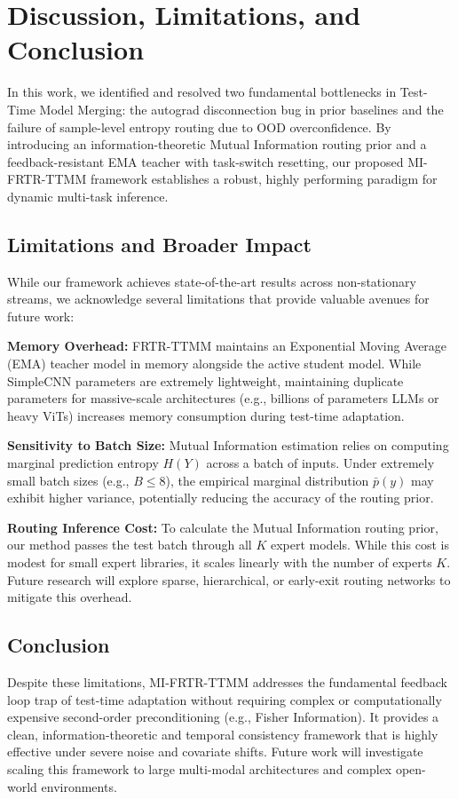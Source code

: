 \documentclass{article}
\theoremstyle{plain}
\theoremstyle{definition}
\theoremstyle{remark}
\begin{document}
\section{Discussion, Limitations, and Conclusion}
In this work, we identified and resolved two fundamental bottlenecks in Test-Time Model Merging: the autograd disconnection bug in prior baselines and the failure of sample-level entropy routing due to OOD overconfidence. By introducing an information-theoretic Mutual Information routing prior and a feedback-resistant EMA teacher with task-switch resetting, our proposed MI-FRTR-TTMM framework establishes a robust, highly performing paradigm for dynamic multi-task inference.

\subsection{Limitations and Broader Impact}
While our framework achieves state-of-the-art results across non-stationary streams, we acknowledge several limitations that provide valuable avenues for future work:

\textbf{Memory Overhead:} FRTR-TTMM maintains an Exponential Moving Average (EMA) teacher model in memory alongside the active student model. While SimpleCNN parameters are extremely lightweight, maintaining duplicate parameters for massive-scale architectures (e.g., billions of parameters LLMs or heavy ViTs) increases memory consumption during test-time adaptation.

\textbf{Sensitivity to Batch Size:} Mutual Information estimation relies on computing marginal prediction entropy $H(Y)$ across a batch of inputs. Under extremely small batch sizes (e.g., $B \leq 8$), the empirical marginal distribution $\bar{p}(y)$ may exhibit higher variance, potentially reducing the accuracy of the routing prior.

\textbf{Routing Inference Cost:} To calculate the Mutual Information routing prior, our method passes the test batch through all $K$ expert models. While this cost is modest for small expert libraries, it scales linearly with the number of experts $K$. Future research will explore sparse, hierarchical, or early-exit routing networks to mitigate this overhead.

\subsection{Conclusion}
Despite these limitations, MI-FRTR-TTMM addresses the fundamental feedback loop trap of test-time adaptation without requiring complex or computationally expensive second-order preconditioning (e.g., Fisher Information). It provides a clean, information-theoretic and temporal consistency framework that is highly effective under severe noise and covariate shifts. Future work will investigate scaling this framework to large multi-modal architectures and complex open-world environments.

\nocite{*}


\end{document}
